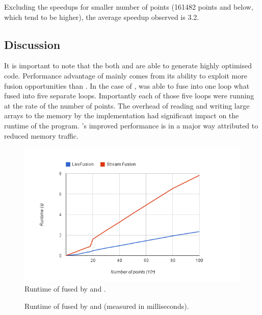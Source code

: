 \documentclass[preamble.tex]{subfiles}
\begin{document}
Excluding the speedups for smaller number of points (161482 points and below, which tend to be higher), the average speedup observed is 3.2.


\subsection{Discussion}

It is important to note that the both \LiveFusion and \StreamFusion are able to generate highly optimised code. Performance advantage of \LiveFusion mainly comes from its ability to exploit more fusion opportunities than \StreamFusion. In the case of \FilterMax, \LiveFusion was able to fuse into one loop what \StreamFusion fused into five separate loops. Importantly each of those five loops were running at the rate of the number of points. The overhead of reading and writing large arrays to the memory by the \StreamFusion implementation had significant impact on the runtime of the program. \LiveFusion's improved performance is in a major way attributed to reduced memory traffic.



\begin{figure}
\includegraphics[scale=0.85,center]{img/Eval-FarAndAboves}
\caption{Runtime of \FilterMax fused by \StreamFusion and \LiveFusion.}
\label{fig:Eval-FarAndAboves}
\end{figure}

\begin{figure}
\caption{Runtime of \FilterMax fused by \StreamFusion and \LiveFusion (measured in milliseconds).}
\label{fig:Eval-FarAndAboves-numbers}
\end{figure}








\IfNotCompilingAll{\printbibliography}
\end{document}
